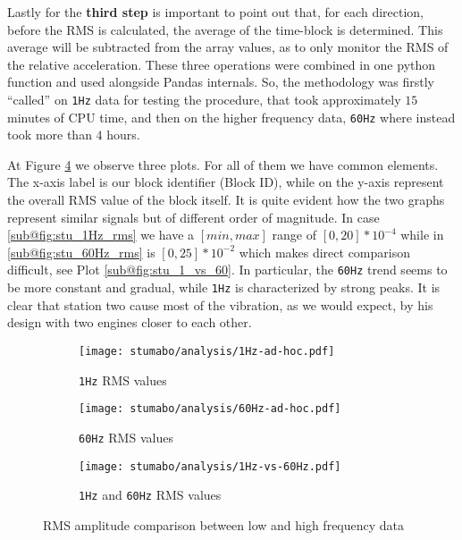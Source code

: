 Lastly for the \textbf{third step} is important to point out that, for each direction, before the RMS is calculated, the average of the time-block is determined. 
This average will be subtracted from the array values, as to only monitor the RMS of the relative acceleration.
These three operations were combined in one python function and used alongside Pandas internals. So, the methodology was firstly ``called'' on \texttt{1Hz} data for testing the procedure, that took approximately $15$ minutes of CPU time, 
and then on the higher frequency data, \texttt{60Hz} where instead took more than $4$ hours.

At Figure \ref{fig:stu_3_rms} we observe three plots.
For all of them we have common elements. The x-axis label is our block identifier (Block ID), while on the y-axis represent the overall RMS value of the block itself. 
It is quite evident how the two graphs represent similar signals but of different order of magnitude. In case \ref{sub@fig:stu_1Hz_rms} we have a $[min, max]$ range of $[0,20] * 10^{-4}$ 
while in \ref{sub@fig:stu_60Hz_rms} is $[0,25] * 10^{-2}$ which makes direct comparison difficult, see Plot \ref{sub@fig:stu_1_vs_60}.
In particular, the \texttt{60Hz} trend seems to be more constant and gradual, while \texttt{1Hz} is characterized by strong peaks. It is clear that station two cause most of the vibration, 
as we would expect, by his design with two engines closer to each other.
\begin{figure}[htp]
    \begin{subfigure}{.495\textwidth}
        \texttt{[image: stumabo/analysis/1Hz-ad-hoc.pdf]}
        \caption{\texttt{1Hz} RMS values}
        \label{fig:stu_1Hz_rms}
    \end{subfigure}
    \begin{subfigure}{.495\textwidth}
        \texttt{[image: stumabo/analysis/60Hz-ad-hoc.pdf]}
        \caption{\texttt{60Hz} RMS values}
        \label{fig:stu_60Hz_rms}
    \end{subfigure}
    \begin{subfigure}{\textwidth}
        \texttt{[image: stumabo/analysis/1Hz-vs-60Hz.pdf]}
        \caption{\texttt{1Hz} and \texttt{60Hz} RMS values}
        \label{fig:stu_1_vs_60}
    \end{subfigure}
    \caption{RMS amplitude comparison between low and high frequency data}
    \label{fig:stu_3_rms}
\end{figure}

